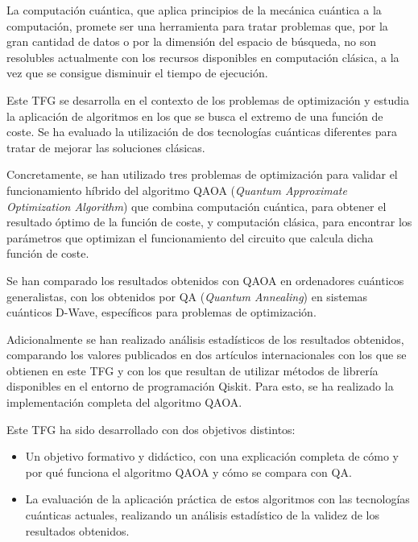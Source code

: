 La computación cuántica, que aplica principios de la mecánica cuántica a la computación, promete ser una herramienta para tratar problemas que, por la gran cantidad de datos o por la dimensión del espacio de búsqueda, no son resolubles actualmente con los recursos disponibles en computación clásica, a la vez que se consigue disminuir el tiempo de ejecución.

Este TFG se desarrolla en el contexto de los problemas de optimización y estudia la aplicación de algoritmos en los que se busca el extremo de una función de coste.
Se ha evaluado la utilización de dos tecnologías cuánticas diferentes para tratar de mejorar las soluciones clásicas. 

Concretamente, se han utilizado tres problemas de optimización para validar el funcionamiento híbrido del algoritmo QAOA (\textit{Quantum Approximate Optimization Algorithm}) que combina computación cuántica, para obtener el resultado óptimo de la función de coste, y computación clásica, para encontrar los parámetros que optimizan el funcionamiento del circuito que calcula dicha función de coste.

Se han comparado  los resultados obtenidos con QAOA en ordenadores cuánticos generalistas, con los obtenidos por QA (\textit{Quantum Annealing}) en sistemas cuánticos D-Wave, específicos para problemas de optimización.

Adicionalmente se han realizado análisis estadísticos de los resultados obtenidos, comparando los valores publicados en dos artículos internacionales con los que se obtienen en este TFG y con los que resultan de utilizar métodos de librería disponibles en el entorno de programación Qiskit.
Para esto, se ha realizado la implementación completa del algoritmo QAOA\@.

Este TFG ha sido desarrollado con dos objetivos distintos:

\begin{itemize}
\item Un objetivo formativo y didáctico, con una explicación completa de cómo y por qué funciona el algoritmo QAOA y cómo se compara con QA\@.

\item La evaluación de la aplicación práctica de estos algoritmos con las tecnologías cuánticas actuales, realizando un análisis estadístico de la validez de los resultados obtenidos.
\end{itemize}


